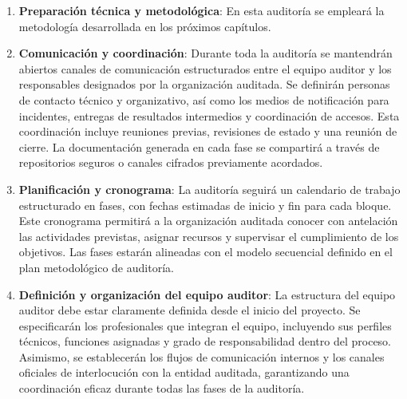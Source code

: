 \documentclass[a4paper, 11pt]{article}
\begin{document}
\begin{enumerate}
\item \textbf{Preparación técnica y metodológica}: En esta auditoría se empleará la metodología desarrollada en los próximos capítulos.

\item \textbf{Comunicación y coordinación}: Durante toda la auditoría se mantendrán abiertos canales de comunicación estructurados entre el equipo auditor y los responsables designados por la organización auditada. Se definirán personas de contacto técnico y organizativo, así como los medios de notificación para incidentes, entregas de resultados intermedios y coordinación de accesos. Esta coordinación incluye reuniones previas, revisiones de estado y una reunión de cierre. La documentación generada en cada fase se compartirá a través de repositorios seguros o canales cifrados previamente acordados.

\item \textbf{Planificación y cronograma}: La auditoría seguirá un calendario de trabajo estructurado en fases, con fechas estimadas de inicio y fin para cada bloque. Este cronograma permitirá a la organización auditada conocer con antelación las actividades previstas, asignar recursos y supervisar el cumplimiento de los objetivos. Las fases estarán alineadas con el modelo secuencial definido en el plan metodológico de auditoría.

\item \textbf{Definición y organización del equipo auditor}: La estructura del equipo auditor debe estar claramente definida desde el inicio del proyecto. Se especificarán los profesionales que integran el equipo, incluyendo sus perfiles técnicos, funciones asignadas y grado de responsabilidad dentro del proceso. Asimismo, se establecerán los flujos de comunicación internos y los canales oficiales de interlocución con la entidad auditada, garantizando una coordinación eficaz durante todas las fases de la auditoría.
\end{enumerate}



















\clearpage
\thispagestyle{nohead}


\end{document}
